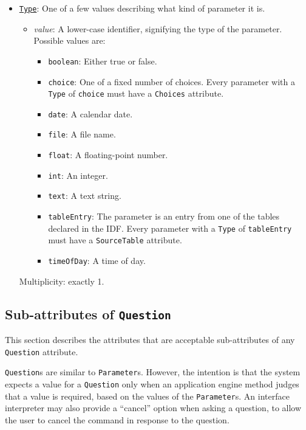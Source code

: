 \documentclass[11pt]{article}
\begin{document}
\begin{itemize}
\item \underline{\tt Type}:  One of a few values describing
what kind of parameter it is.
\begin{itemize}
\item {\it value}: A lower-case identifier, signifying the
  type of the parameter.  Possible values are:
  \begin{itemize}
  \item {\tt boolean}:  Either true or false.
  \item {\tt choice}:  One of a fixed number of choices.
    Every parameter with a {\tt Type} of {\tt choice} must
    have a {\tt Choices} attribute.
  \item {\tt date}:  A calendar date.
  \item {\tt file}:  A file name.
  \item {\tt float}:  A floating-point number.
  \item {\tt int}:  An integer.
  \item {\tt text}:  A text string.
  \item {\tt tableEntry}:  The parameter is an entry from
    one of the tables declared in the IDF.
    Every parameter with a {\tt Type} of {\tt tableEntry} must
    have a {\tt SourceTable} attribute.
  \item {\tt timeOfDay}:  A time of day.
  \end{itemize}
\end{itemize}
Multiplicity: exactly 1.

\end{itemize}


\subsection{Sub-attributes of {\tt Question}}
\label{sub-attr-question-sec}

This section describes the attributes that are acceptable
sub-attributes of any {\tt Question} attribute.

{\tt Question}s are similar to {\tt Parameter}s.  However, the
intention is that the system expects a value for a {\tt Question}
only when an application engine method judges that a value is
required, based on the values of the {\tt Parameter}s.
An interface interpreter may also provide a ``cancel'' option
when asking a question, to allow the user to cancel the command
in response to the question.
\end{document}
